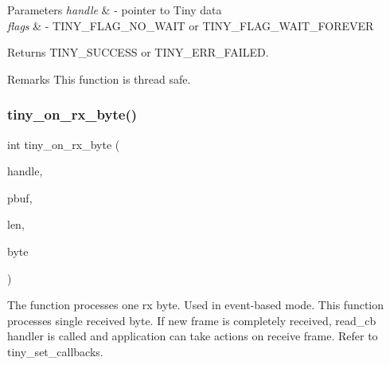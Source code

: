 \begin{DoxyParams}{Parameters}
{\em handle} & -\/ pointer to Tiny data \\
\hline
{\em flags} & -\/ T\+I\+N\+Y\+\_\+\+F\+L\+A\+G\+\_\+\+N\+O\+\_\+\+W\+A\+IT or T\+I\+N\+Y\+\_\+\+F\+L\+A\+G\+\_\+\+W\+A\+I\+T\+\_\+\+F\+O\+R\+E\+V\+ER \\
\hline
\end{DoxyParams}
\begin{DoxyReturn}{Returns}
T\+I\+N\+Y\+\_\+\+S\+U\+C\+C\+E\+SS or T\+I\+N\+Y\+\_\+\+E\+R\+R\+\_\+\+F\+A\+I\+L\+ED. 
\end{DoxyReturn}
\begin{DoxyRemark}{Remarks}
This function is thread safe. 
\end{DoxyRemark}
\mbox{\label{group__ADVANCED__API_gaaf9bf6423bd0b8388c3387225b805278}} 
\subsubsection{\texorpdfstring{tiny\+\_\+on\+\_\+rx\+\_\+byte()}{tiny\_on\_rx\_byte()}}
{\footnotesize\ttfamily int tiny\+\_\+on\+\_\+rx\+\_\+byte (\begin{DoxyParamCaption}\item[{\hyperlink{structSTinyData}{S\+Tiny\+Data} $\ast$}]{handle,  }\item[{uint8\+\_\+t $\ast$}]{pbuf,  }\item[{int}]{len,  }\item[{uint8\+\_\+t}]{byte }\end{DoxyParamCaption})}



The function processes one rx byte. Used in event-\/based mode. This function processes single received byte. If new frame is completely received, read\+\_\+cb handler is called and application can take actions on receive frame. Refer to tiny\+\_\+set\+\_\+callbacks. 


